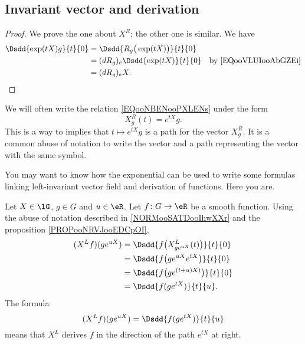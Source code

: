 \subsection{Invariant vector and derivation}

\begin{proof}
	We prove the one about \( X^R\); the other one is similar. We have
	\begin{subequations}
		\begin{align}
			\Dsdd{ \exp(tX)g }{t}{0} & =\Dsdd{ R_g\big( \exp(tX) \big) }{t}{0}                                      \\
			                         & =(dR_g)_e\Dsdd{ \exp(tX) }{t}{0}        & \text{by \eqref{EQooVLUIooAbGZEi}} \\
			                         & =(dR_g)_eX.
		\end{align}
	\end{subequations}
\end{proof}

\begin{normaltext}      \label{NORMooSATDooIhwXXr}
	We will often write the relation \eqref{EQooNBENooPXLENs} under the form
	\begin{equation}
		X^R_g(t)= e^{tX}g.
	\end{equation}
	This is a way to implies that \( t\mapsto  e^{tX}g\) is a path for the vector \( X^R_g\). It is a common abuse of notation to write the vector and a path representing the vector with the same symbol.
\end{normaltext}


You may want to know how the exponential can be used to write some formulas linking left-invariant vector field and derivation of functions. Here you are.

\begin{normaltext}
	Let \( X\in \lG\), \( g\in G\) and \( u\in \eR\). Let \( f\colon G\to \eR\) be a smooth function. Using the abuse of notation described in \ref{NORMooSATDooIhwXXr} and the proposition \ref{PROPooNRVJooEDCpOI},
	\begin{subequations}
		\begin{align}
			(X^Lf)(g e^{uX}) & =\Dsdd{ f\big( X^L_{g e^{uX}}(t) \big) }{t}{0} \\
			                 & =\Dsdd{ f\big( g e^{uX} e^{tX} \big) }{t}{0}   \\
			                 & =\Dsdd{ f\big( g e^{(t+u)X)} \big)}{t}{0}      \\
			                 & =\Dsdd{ f(g e^{tX}) }{t}{u}.
		\end{align}
	\end{subequations}
	The formula
	\begin{equation}
		(X^Lf)(g e^{uX})=\Dsdd{ f(g e^{tX}) }{t}{u}
	\end{equation}
	means that \( X^L\) derives \( f\) in the direction of the path \(  e^{tX}\) at right.
\end{normaltext}

